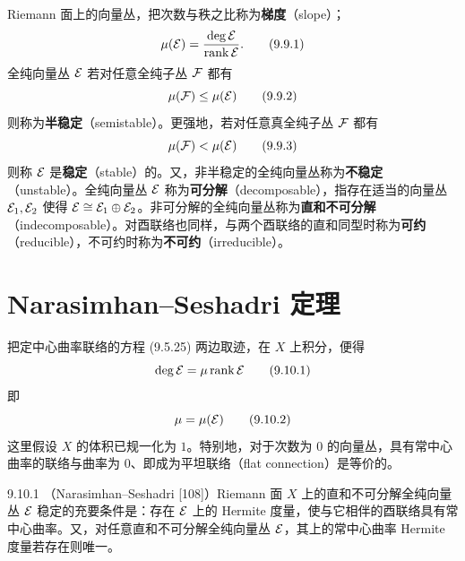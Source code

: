 Riemann 面上的向量丛，把次数与秩之比称为\textbf{梯度}（slope）；
\begin{equation}
  \mu(\mathcal{E}) = \frac{\deg\mathcal{E}}{\operatorname{rank}\mathcal{E}}.
  \tag{9.9.1}
\end{equation}
全纯向量丛 $\mathcal{E}$ 若对任意全纯子丛 $\mathcal{F}$ 都有
\begin{equation}
  \mu(\mathcal{F}) \le \mu(\mathcal{E})
  \tag{9.9.2}
\end{equation}
则称为\textbf{半稳定}（semistable）。更强地，若对任意真全纯子丛 $\mathcal{F}$ 都有
\begin{equation}
  \mu(\mathcal{F}) < \mu(\mathcal{E})
  \tag{9.9.3}
\end{equation}
则称 $\mathcal{E}$ 是\textbf{稳定}（stable）的。又，非半稳定的全纯向量丛称为\textbf{不稳定}（unstable）。全纯向量丛 $\mathcal{E}$ 称为\textbf{可分解}（decomposable），指存在适当的向量丛 $\mathcal{E}_1,\mathcal{E}_2$ 使得 $\mathcal{E}\cong\mathcal{E}_1\oplus\mathcal{E}_2$。非可分解的全纯向量丛称为\textbf{直和不可分解}（indecomposable）。对酉联络也同样，与两个酉联络的直和同型时称为\textbf{可约}（reducible），不可约时称为\textbf{不可约}（irreducible）。



\section{Narasimhan--Seshadri 定理}

把定中心曲率联络的方程 (9.5.25) 两边取迹，在 $X$ 上积分，便得
\begin{equation}
  \deg\mathcal{E} = \mu\operatorname{rank}\mathcal{E}
  \tag{9.10.1}
\end{equation}
即
\begin{equation}
  \mu = \mu(\mathcal{E})
  \tag{9.10.2}
\end{equation}
这里假设 $X$ 的体积已规一化为 $1$。特别地，对于次数为 $0$ 的向量丛，具有常中心曲率的联络与曲率为 $0$、即成为平坦联络（flat connection）是等价的。

\begin{theorem*}{9.10.1}
（Narasimhan--Seshadri [108]）Riemann 面 $X$ 上的直和不可分解全纯向量丛 $\mathcal{E}$ 稳定的充要条件是：存在 $\mathcal{E}$ 上的 Hermite 度量，使与它相伴的酉联络具有常中心曲率。又，对任意直和不可分解全纯向量丛 $\mathcal{E}$，其上的常中心曲率 Hermite 度量若存在则唯一。
\end{theorem*}

